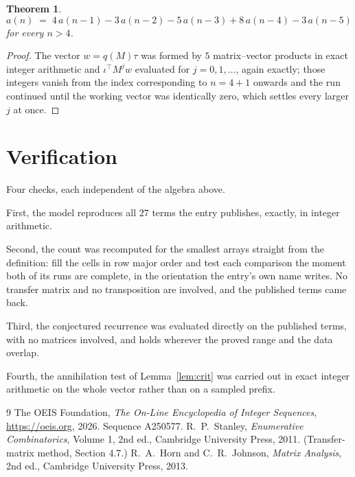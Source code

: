 \documentclass[11pt,a4paper]{article}
\theoremstyle{plain}
\newtheorem{theorem}{Theorem}
\theoremstyle{definition}
\begin{document}
\begin{theorem}
\[
a(n)\;=\;4\,a(n-1) - 3\,a(n-2) - 5\,a(n-3) + 8\,a(n-4) - 3\,a(n-5)
\]
for every $n>4$.
\end{theorem}

\begin{proof}
The vector $w=q(M)\tau$ was formed by $5$ matrix--vector products in exact integer
arithmetic and $\iota^{\!\top}M^{j}w$ evaluated for $j=0,1,\dots$, again exactly; those
integers vanish from the index corresponding to $n=4+1$ onwards and the run continued
until the working vector was identically zero, which settles every larger $j$ at once.
\end{proof}

\section{Verification}

Four checks, each independent of the algebra above.

First, the model reproduces all $27$ terms the entry publishes, exactly, in integer
arithmetic.

Second, the count was recomputed for the smallest arrays straight from the definition: fill the
cells in row major order and test each comparison the moment both of its runs are complete,
in the orientation the entry's own name writes. No transfer matrix and no transposition are
involved, and the published terms came back.

Third, the conjectured recurrence was evaluated directly on the published terms, with no
matrices involved, and holds wherever the proved range and the data overlap.

Fourth, the annihilation test of Lemma~\ref{lem:crit} was carried out in exact integer
arithmetic on the whole vector rather than on a sampled prefix.

\begin{thebibliography}{9}
 The OEIS Foundation, \emph{The On-Line Encyclopedia of Integer
Sequences}, \url{https://oeis.org}, 2026. Sequence A250577.
 R.~P.~Stanley, \emph{Enumerative Combinatorics}, Volume 1, 2nd ed.,
Cambridge University Press, 2011. (Transfer-matrix method, Section 4.7.)
 R.~A.~Horn and C.~R.~Johnson, \emph{Matrix Analysis}, 2nd ed., Cambridge
University Press, 2013.
\end{thebibliography}
\end{document}
